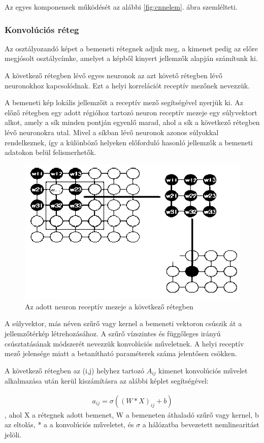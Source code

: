 \documentclass[12pt,a4]{article}
\begin{document}
	Az egyes komponensek működését az alábbi \ref{fig:cnnelem}. ábra szemlélteti.

	
	\subsubsection{Konvolúciós réteg}
	
	Az osztályozandó képet a bemeneti rétegnek adjuk meg, a kimenet pedig az előre megjósolt osztálycímke, amelyet a képből kinyert jellemzők alapján számítunk ki.
	
	A következő rétegben lévő egyes neuronok az azt követő rétegben lévő neuronokhoz kapcsolódnak. Ezt a helyi korrelációt receptív mezőnek nevezzük.
	
	A bemeneti kép lokális jellemzőit a receptív mező segítségével nyerjük ki. Az előző rétegben egy adott régióhoz tartozó neuron receptív mezeje egy súlyvektort alkot, amely a sík minden pontján egyenlő marad, ahol a sík a következő rétegben lévő neuronokra utal. Mivel a síkban lévő neuronok azonos súlyokkal rendelkeznek, így a különböző helyeken előforduló hasonló jellemzők a bemeneti adatokon belül felismerhetők.
	
	\begin{figure}[h]	
		\centering
		\includegraphics[width=0.7\linewidth]{receptiv}
		\caption{\cite{CNN} Az adott neuron receptív mezeje a következő rétegben}
	\end{figure}
		\newpage
	A súlyvektor, más néven szűrő vagy kernel a bemeneti vektoron csúszik át a jellemzőtérkép létrehozásához.
	A szűrő vízszintes és függőleges irányú csúsztatásának módszerét nevezzük konvolúciós műveletnek. A helyi receptív mező jelensége miatt a betanítható paraméterek száma jelentősen csökken.
	
	A következő rétegben az (i,j) helyhez tartozó $A_{ij}$ kimenet konvolúciós
	művelet alkalmazása után kerül kiszámításra az alábbi képlet segítségével:
	\begin{mdframed}
	\begin{align}
		a_{ij} = \sigma((W * X)_{ij} + b)
	\end{align}
	, ahol X a rétegnek adott bemenet, W a bemeneten áthaladó szűrő vagy kernel,
	b az eltolás, * a 
	a konvolúciós műveletet, és $\sigma$ a hálózatba bevezetett nemlinearitást jelöli.
	\end{mdframed}
	
\end{document}
